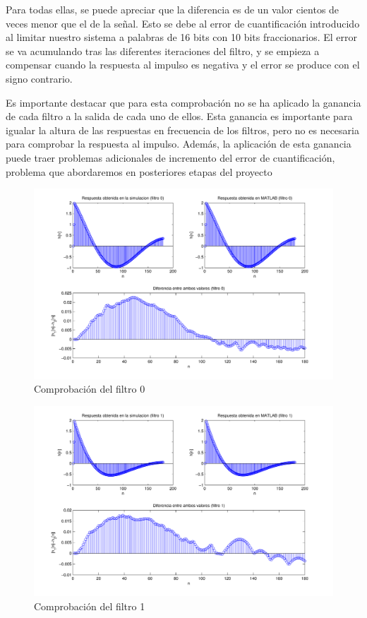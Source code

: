 \documentclass[a4paper,12pt]{article}
\begin{document}
Para todas ellas, se puede apreciar que la diferencia es de un valor cientos de veces menor que el de la señal. Esto se debe al error de cuantificación introducido al limitar nuestro sistema a palabras de 16 bits con 10 bits fraccionarios. El error se va acumulando tras las diferentes iteraciones del filtro, y se empieza a compensar cuando la respuesta al impulso es negativa y el error se produce con el signo contrario. 

Es importante destacar que para esta comprobación no se ha aplicado la ganancia de cada filtro a la salida de cada uno de ellos. Esta ganancia es importante para igualar la altura de las respuestas en frecuencia de los filtros, pero no es necesaria para comprobar la respuesta al impulso. Además, la aplicación de esta ganancia puede traer problemas adicionales de incremento del error de cuantificación, problema que abordaremos en posteriores etapas del proyecto

\begin{figure}[hbt]
\includegraphics[width=\textwidth]{img/respfiltro0.pdf} 
\caption{Comprobación del filtro 0} \label{fig:filter0}
\end{figure}

\begin{figure}[hbt]
\includegraphics[width=\textwidth]{img/respfiltro1.pdf} 
\caption{Comprobación del filtro 1} \label{fig:filter1}
\end{figure}
\end{document}
